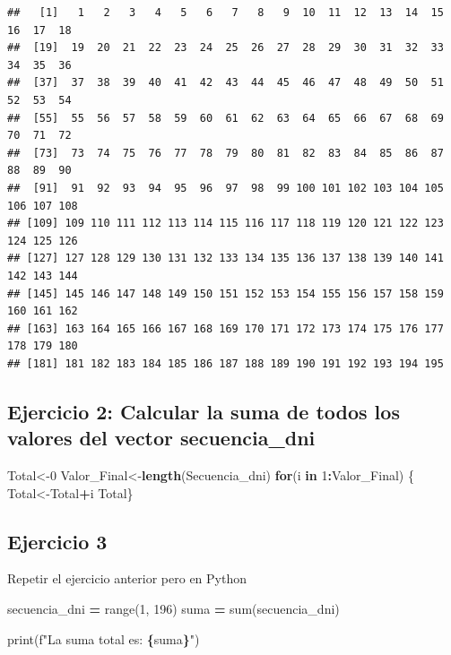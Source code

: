 \documentclass[]{llncs}
\newenvironment{Shaded}{\begin{snugshade}}{\end{snugshade}}
\newcommand{\BuiltInTok}[1]{#1}
\newcommand{\ControlFlowTok}[1]{\textcolor[rgb]{0.13,0.29,0.53}{\textbf{#1}}}
\newcommand{\DecValTok}[1]{\textcolor[rgb]{0.00,0.00,0.81}{#1}}
\newcommand{\FunctionTok}[1]{\textcolor[rgb]{0.13,0.29,0.53}{\textbf{#1}}}
\newcommand{\NormalTok}[1]{#1}
\newcommand{\OperatorTok}[1]{\textcolor[rgb]{0.81,0.36,0.00}{\textbf{#1}}}
\newcommand{\OtherTok}[1]{\textcolor[rgb]{0.56,0.35,0.01}{#1}}
\newcommand{\SpecialCharTok}[1]{\textcolor[rgb]{0.81,0.36,0.00}{\textbf{#1}}}
\newcommand{\SpecialStringTok}[1]{\textcolor[rgb]{0.31,0.60,0.02}{#1}}
\begin{document}
\begin{verbatim}
##   [1]   1   2   3   4   5   6   7   8   9  10  11  12  13  14  15  16  17  18
##  [19]  19  20  21  22  23  24  25  26  27  28  29  30  31  32  33  34  35  36
##  [37]  37  38  39  40  41  42  43  44  45  46  47  48  49  50  51  52  53  54
##  [55]  55  56  57  58  59  60  61  62  63  64  65  66  67  68  69  70  71  72
##  [73]  73  74  75  76  77  78  79  80  81  82  83  84  85  86  87  88  89  90
##  [91]  91  92  93  94  95  96  97  98  99 100 101 102 103 104 105 106 107 108
## [109] 109 110 111 112 113 114 115 116 117 118 119 120 121 122 123 124 125 126
## [127] 127 128 129 130 131 132 133 134 135 136 137 138 139 140 141 142 143 144
## [145] 145 146 147 148 149 150 151 152 153 154 155 156 157 158 159 160 161 162
## [163] 163 164 165 166 167 168 169 170 171 172 173 174 175 176 177 178 179 180
## [181] 181 182 183 184 185 186 187 188 189 190 191 192 193 194 195
\end{verbatim}

\subsection{Ejercicio 2: Calcular la suma de todos los valores del
vector
secuencia\_dni}\label{ejercicio-2-calcular-la-suma-de-todos-los-valores-del-vector-secuencia_dni}

\begin{Shaded}
\begin{Highlighting}[]
\NormalTok{Total}\OtherTok{\textless{}{-}}\DecValTok{0}
\NormalTok{Valor\_Final}\OtherTok{\textless{}{-}}\FunctionTok{length}\NormalTok{(Secuencia\_dni)}
\ControlFlowTok{for}\NormalTok{(i }\ControlFlowTok{in} \DecValTok{1}\SpecialCharTok{:}\NormalTok{Valor\_Final) \{}
\NormalTok{  Total}\OtherTok{\textless{}{-}}\NormalTok{Total}\SpecialCharTok{+}\NormalTok{i}
\NormalTok{  Total\}}
\end{Highlighting}
\end{Shaded}

\subsection{Ejercicio 3}\label{ejercicio-3}

Repetir el ejercicio anterior pero en Python

\begin{Shaded}
\begin{Highlighting}[]
\NormalTok{secuencia\_dni }\OperatorTok{=} \BuiltInTok{range}\NormalTok{(}\DecValTok{1}\NormalTok{, }\DecValTok{196}\NormalTok{)}
\NormalTok{suma }\OperatorTok{=} \BuiltInTok{sum}\NormalTok{(secuencia\_dni)}

\BuiltInTok{print}\NormalTok{(}\SpecialStringTok{f"La suma total es: }\SpecialCharTok{\{}\NormalTok{suma}\SpecialCharTok{\}}\SpecialStringTok{"}\NormalTok{)}
\end{Highlighting}
\end{Shaded}
\end{document}
